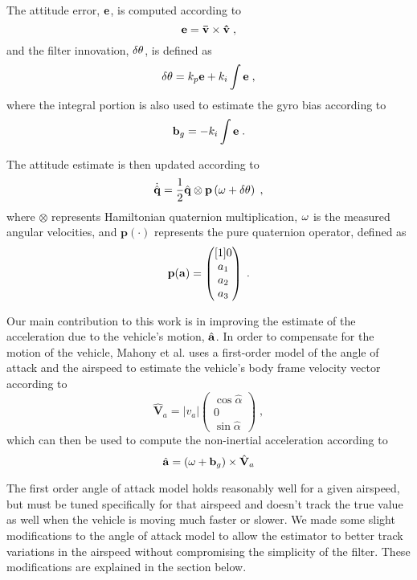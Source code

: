 The attitude error, $\e$, is computed according to
\begin{equation}
	\e = \vbar \times \vhat \;,
\end{equation}
and the filter innovation, $\dth$, is defined as
\begin{equation}
	\dth = k_p \e + k_i \int \e \;,
\end{equation} 
where the integral portion is also used to estimate the gyro bias according to
\begin{equation}
	\mathbf{b}_g = - k_i \int \e \;.
\end{equation}

The attitude estimate is then updated according to
\begin{equation}
	\dot{\q[\hat]} = \frac{1}{2}\q[\hat] \otimes \mathbf{p}\left(\angvel + \dth \right) \;,
\end{equation}
where $\otimes$ represents Hamiltonian quaternion multiplication, $\angvel$ is the measured angular velocities, and $\mathbf{p}(\cdot)$ represents the pure quaternion operator, defined as
\begin{equation}
	\mathbf{p}(\mathbf{a}) = \pmat{0 \\ a_1 \\ a_2 \\ a_3} \;.
\end{equation}

Our main contribution to this work is in improving the estimate of the acceleration due to the vehicle's motion, $\accel[\hat]$. In order to compensate for the motion of the vehicle, Mahony et al. uses a first-order model of the angle of attack and the airspeed to estimate the vehicle's body frame velocity vector according to
\begin{equation} \label{eq:vair_vec}
    \hat{\mathbf{V}}_a = \lvert v_a \rvert
    \begin{pmatrix}
    \cos\hat{\alpha} \\
    0 \\
    \sin\hat{\alpha}
    \end{pmatrix} \;,
\end{equation}
which can then be used to compute the non-inertial acceleration according to
\begin{equation}
	\accel[\hat] = \left( \angvel + \mathbf{b}_g \right) \times \hat{\mathbf{V}}_a
\end{equation}

The first order angle of attack model holds reasonably well for a given airspeed, but must be tuned specifically for that airspeed and doesn't track the true value as well when the vehicle is moving much faster or slower. We made some slight modifications to the angle of attack model to allow the estimator to better track variations in the airspeed without compromising the simplicity of the filter.
These modifications are explained in the section below.

